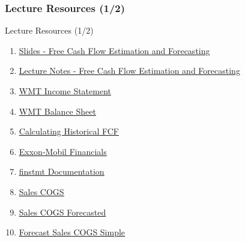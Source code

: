 \documentclass[handout, 11pt]{beamer}
\begin{document}
\begin{frame}
\frametitle{Lecture Resources (1/2)}
{
\begin{block}{Lecture Resources (1/2)}
\begin{enumerate}
\item \textcolor{blue}{\underline{\href{https://nickderobertis.github.io/fin-model-course/\_static/generated/pdfs/S12 Free Cash Flow Estimation and Forecasting.pdf}{Slides - Free Cash Flow Estimation and Forecasting}}}
\item \textcolor{blue}{\underline{\href{https://nickderobertis.github.io/fin-model-course/\_static/generated/pdfs/LN12 Free Cash Flow Estimation and Forecasting.pdf}{Lecture Notes - Free Cash Flow Estimation and Forecasting}}}
\item \textcolor{blue}{\underline{\href{https://nickderobertis.github.io/fin-model-course/\_static/Materials for Lab Exercises/DCF/FCF/WMT Income Statement.xlsx}{WMT Income Statement}}}
\item \textcolor{blue}{\underline{\href{https://nickderobertis.github.io/fin-model-course/\_static/Materials for Lab Exercises/DCF/FCF/WMT Balance Sheet.xlsx}{WMT Balance Sheet}}}
\item \textcolor{blue}{\underline{\href{https://nickderobertis.github.io/fin-model-course/\_static/Examples/DCF/Historical FCF/Calculating Historical FCF.ipynb}{Calculating Historical FCF}}}
\item \textcolor{blue}{\underline{\href{https://nickderobertis.github.io/fin-model-course/\_static/Examples/DCF/Historical FCF/Exxon Mobil Corporation NYSE XOM Financials.xls}{Exxon-Mobil Financials}}}
\item \textcolor{blue}{\underline{\href{https://nickderobertis.github.io/py-finstmt/}{finstmt Documentation}}}
\item \textcolor{blue}{\underline{\href{https://nickderobertis.github.io/fin-model-course/\_static/Examples/DCF/Forecasting/Simple/Sales COGS.xlsx}{Sales COGS}}}
\item \textcolor{blue}{\underline{\href{https://nickderobertis.github.io/fin-model-course/\_static/Examples/DCF/Forecasting/Simple/Sales COGS Forecasted.xlsx}{Sales COGS Forecasted}}}
\item \textcolor{blue}{\underline{\href{https://nickderobertis.github.io/fin-model-course/\_static/Examples/DCF/Forecasting/Simple/Forecast Sales COGS Simple.ipynb}{Forecast Sales COGS Simple}}}
\end{enumerate}
\vfill
\end{block}
}
\label{frames:resources}
\end{frame}
\end{document}
